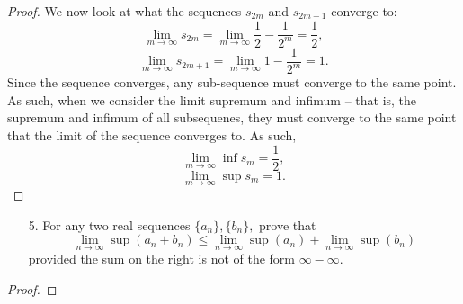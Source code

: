 \documentclass[10pt]{article}
\theoremstyle{definition}
\theoremstyle{plain}
\begin{document}
\begin{proof}
We now look at what the sequences $s_{2m}$ and $s_{2m+1}$ converge to:
$$\lim_{m\rightarrow\infty} s_{2m} = \lim_{m\rightarrow\infty} \frac{1}{2} - \frac{1}{2^m} = \frac{1}{2},$$
$$\lim_{m\rightarrow\infty} s_{2m+1} = \lim_{m\rightarrow\infty} 1 - \frac{1}{2^m} = 1.$$
Since the sequence converges, any sub-sequence must converge to the same point. As such, when we consider the limit supremum and infimum -- that is, the supremum and infimum of all subsequenes, they must converge to the same point that the limit of the sequence converges to. As such,
$$\lim_{m\rightarrow\infty}\inf s_{m} = \frac{1}{2},$$
$$\lim_{m\rightarrow\infty}\sup s_{m} = 1.$$

\end{proof}



\pagebreak



\begin{enumerate}
\item[5.] For any two real sequences $\{a_n\}, \{b_n\},$ prove that
$$\lim_{n\rightarrow\infty} \sup(a_n+b_n)\leq \lim_{n\rightarrow\infty} \sup(a_n) + \lim_{n\rightarrow\infty} \sup(b_n)$$
provided the sum on the right is not of the form $\infty-\infty$.
\end{enumerate}

\begin{proof}

\end{proof}



\pagebreak
\end{document}

